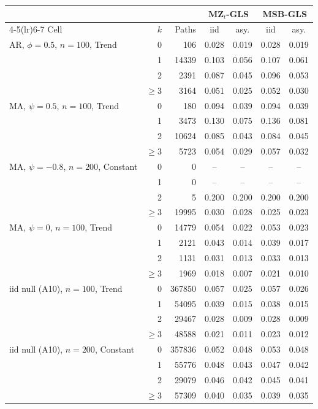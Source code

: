 \begin{tabular}{lrrcccc}
\toprule
& & & \multicolumn{2}{c}{MZ$_t$-GLS} & \multicolumn{2}{c}{MSB-GLS}\\
\cmidrule(lr){4-5}\cmidrule(lr){6-7}
Cell & $k$ & Paths & iid & asy. & iid & asy.\\
\midrule
AR, $\phi = 0.5$, $n = 100$, Trend & 0 & 106 & 0.028 & 0.019 & 0.028 & 0.019 \\
 & 1 & 14339 & 0.103 & 0.056 & 0.107 & 0.061 \\
 & 2 & 2391 & 0.087 & 0.045 & 0.096 & 0.053 \\
 & $\geq 3$ & 3164 & 0.051 & 0.025 & 0.052 & 0.030 \\
\addlinespace
MA, $\psi = 0.5$, $n = 100$, Trend & 0 & 180 & 0.094 & 0.039 & 0.094 & 0.039 \\
 & 1 & 3473 & 0.130 & 0.075 & 0.136 & 0.081 \\
 & 2 & 10624 & 0.085 & 0.043 & 0.084 & 0.045 \\
 & $\geq 3$ & 5723 & 0.054 & 0.029 & 0.057 & 0.032 \\
\addlinespace
MA, $\psi = -0.8$, $n = 200$, Constant & 0 & 0 & -- & -- & -- & -- \\
 & 1 & 0 & -- & -- & -- & -- \\
 & 2 & 5 & 0.200 & 0.200 & 0.200 & 0.200 \\
 & $\geq 3$ & 19995 & 0.030 & 0.028 & 0.025 & 0.023 \\
\addlinespace
MA, $\psi = 0$, $n = 100$, Trend & 0 & 14779 & 0.054 & 0.022 & 0.053 & 0.023 \\
 & 1 & 2121 & 0.043 & 0.014 & 0.039 & 0.017 \\
 & 2 & 1131 & 0.031 & 0.013 & 0.033 & 0.013 \\
 & $\geq 3$ & 1969 & 0.018 & 0.007 & 0.021 & 0.010 \\
\addlinespace
iid null (A10), $n = 100$, Trend & 0 & 367850 & 0.057 & 0.025 & 0.057 & 0.026 \\
 & 1 & 54095 & 0.039 & 0.015 & 0.038 & 0.015 \\
 & 2 & 29467 & 0.028 & 0.009 & 0.028 & 0.009 \\
 & $\geq 3$ & 48588 & 0.021 & 0.011 & 0.023 & 0.012 \\
\addlinespace
iid null (A10), $n = 200$, Constant & 0 & 357836 & 0.052 & 0.048 & 0.053 & 0.048 \\
 & 1 & 55776 & 0.048 & 0.043 & 0.047 & 0.042 \\
 & 2 & 29079 & 0.046 & 0.042 & 0.045 & 0.041 \\
 & $\geq 3$ & 57309 & 0.040 & 0.035 & 0.039 & 0.035 \\
\bottomrule
\end{tabular}
